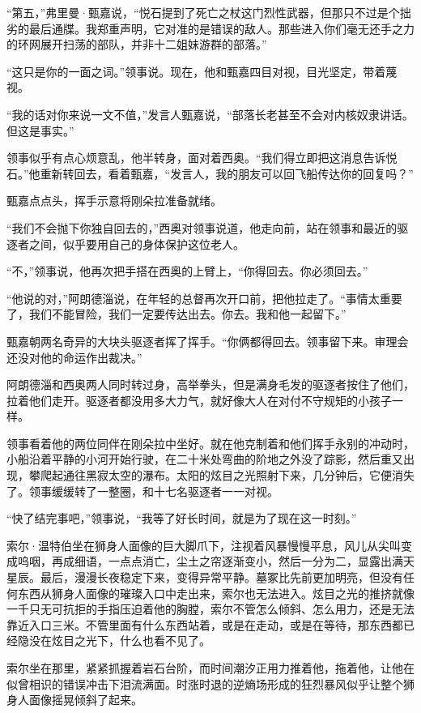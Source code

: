 \documentclass[AutoFakeBold=true]{book}
\begin{document}
``第五，''弗里曼·甄嘉说，``悦石提到了死亡之杖这门烈性武器，但那只不过是个拙劣的最后通牒。我郑重声明，它对准的是错误的敌人。那些进入你们毫无还手之力的环网展开扫荡的部队，并非十二姐妹游群的部落。''

``这只是你的一面之词。''领事说。现在，他和甄嘉四目对视，目光坚定，带着蔑视。

``我的话对你来说一文不值，''发言人甄嘉说，``部落长老甚至不会对内核奴隶讲话。但这是事实。''

领事似乎有点心烦意乱，他半转身，面对着西奥。``我们得立即把这消息告诉悦石。''他重新转回去，看着甄嘉，``发言人，我的朋友可以回飞船传达你的回复吗？''

甄嘉点点头，挥手示意将刚朵拉准备就绪。

``我们不会抛下你独自回去的，''西奥对领事说道，他走向前，站在领事和最近的驱逐者之间，似乎要用自己的身体保护这位老人。

``不，''领事说，他再次把手搭在西奥的上臂上，``你得回去。你必须回去。''

``他说的对，''阿朗德淄说，在年轻的总督再次开口前，把他拉走了。``事情太重要了，我们不能冒险，我们一定要传达出去。你去。我和他一起留下。''

甄嘉朝两名奇异的大块头驱逐者挥了挥手。``你俩都得回去。领事留下来。审理会还没对他的命运作出裁决。''

阿朗德淄和西奥两人同时转过身，高举拳头，但是满身毛发的驱逐者按住了他们，拉着他们走开。驱逐者都没用多大力气，就好像大人在对付不守规矩的小孩子一样。

领事看着他的两位同伴在刚朵拉中坐好。就在他克制着和他们挥手永别的冲动时，小船沿着平静的小河开始行驶，在二十米处弯曲的阶地之外没了踪影，然后重又出现，攀爬起通往黑寂太空的瀑布。太阳的炫目之光照射下来，几分钟后，它便消失了。领事缓缓转了一整圈，和十七名驱逐者一一对视。

``快了结完事吧，''领事说，``我等了好长时间，就是为了现在这一时刻。''

\vspace*{1em}

索尔·温特伯坐在狮身人面像的巨大脚爪下，注视着风暴慢慢平息，风儿从尖叫变成呜咽，再成细语，一点点消亡，尘土之帘逐渐变小，然后一分为二，显露出满天星辰。最后，漫漫长夜稳定下来，变得异常平静。墓冢比先前更加明亮，但没有任何东西从狮身人面像的璀璨入口中走出来，索尔也无法进入。炫目之光的推挤就像一千只无可抗拒的手指压迫着他的胸膛，索尔不管怎么倾斜、怎么用力，还是无法靠近入口三米。不管里面有什么东西站着，或是在走动，或是在等待，那东西都已经隐没在炫目之光下，什么也看不见了。

索尔坐在那里，紧紧抓握着岩石台阶，而时间潮汐正用力推着他，拖着他，让他在似曾相识的错误冲击下泪流满面。时涨时退的逆熵场形成的狂烈暴风似乎让整个狮身人面像摇晃倾斜了起来。
\end{document}
